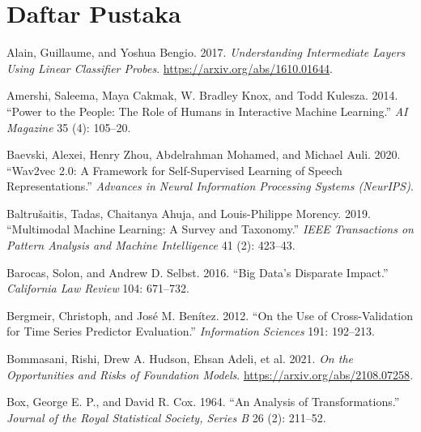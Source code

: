 \chapter*{Daftar Pustaka}

\protect{}\label{refs}
\begin{CSLReferences}{1}{1}
Alain, Guillaume, and Yoshua Bengio. 2017. \emph{Understanding Intermediate Layers Using Linear Classifier Probes}. \url{https://arxiv.org/abs/1610.01644}.

Amershi, Saleema, Maya Cakmak, W. Bradley Knox, and Todd Kulesza. 2014. {``Power to the People: The Role of Humans in Interactive Machine Learning.''} \emph{AI Magazine} 35 (4): 105--20.

Baevski, Alexei, Henry Zhou, Abdelrahman Mohamed, and Michael Auli. 2020. {``Wav2vec 2.0: A Framework for Self-Supervised Learning of Speech Representations.''} \emph{Advances in Neural Information Processing Systems (NeurIPS)}.

Baltrušaitis, Tadas, Chaitanya Ahuja, and Louis-Philippe Morency. 2019. {``Multimodal Machine Learning: A Survey and Taxonomy.''} \emph{IEEE Transactions on Pattern Analysis and Machine Intelligence} 41 (2): 423--43.

Barocas, Solon, and Andrew D. Selbst. 2016. {``Big Data's Disparate Impact.''} \emph{California Law Review} 104: 671--732.

Bergmeir, Christoph, and José M. Benítez. 2012. {``On the Use of Cross-Validation for Time Series Predictor Evaluation.''} \emph{Information Sciences} 191: 192--213.

{Bommasani, Rishi, Drew A. Hudson, Ehsan Adeli, et al.} 2021. \emph{On the Opportunities and Risks of Foundation Models}. \url{https://arxiv.org/abs/2108.07258}.

Box, George E. P., and David R. Cox. 1964. {``An Analysis of Transformations.''} \emph{Journal of the Royal Statistical Society, Series B} 26 (2): 211--52.


\end{CSLReferences}
